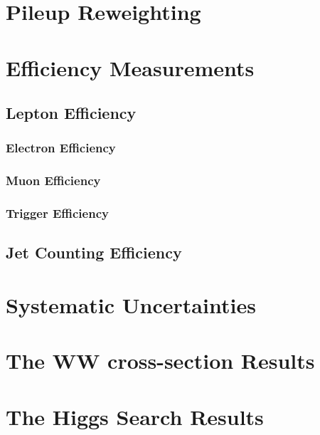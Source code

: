 \documentclass{cmspaper}
\begin{document}
\section{Pileup Reweighting}
     \label{sec:pileupReweighting}
     

\section{Efficiency Measurements}
     \label{sec:alleff}
     \subsection{Lepton Efficiency}
     \label{sec:efficiency}
     
	 \subsubsection{Electron Efficiency}
	 \label{sec:eff_electron}
	 
	 \subsubsection{Muon Efficiency}
	 \label{sec:eff_muon}
	 
	 \subsubsection{Trigger Efficiency}
	 \label{sec:eff_trigger}
	 
     \subsection{Jet Counting Efficiency}
     

\section{Systematic Uncertainties}
   \label{sec:systematics}
   

\newpage 

\section{The WW cross-section Results}
    \label{sec:wwxsecresults}
    

\section{The Higgs Search Results}
   \label{sec:dataresults}
   
\end{document}

